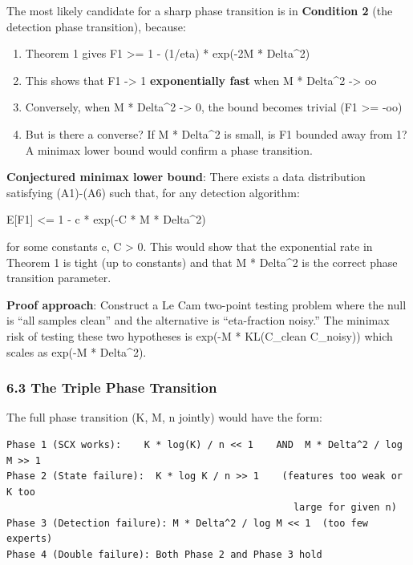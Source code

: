 \documentclass[
  12pt,
]{article}
\providecommand{\tightlist}{%
  \setlength{\itemsep}{0pt}\setlength{\parskip}{0pt}}
\begin{document}
The most likely candidate for a sharp phase transition is in
\textbf{Condition 2} (the detection phase transition), because:

\begin{enumerate}
\def\labelenumi{\arabic{enumi}.}
\tightlist
\item
  Theorem 1 gives F1 \textgreater= 1 - (1/eta) * exp(-2M * Delta\^{}2)
\item
  This shows that F1 -\textgreater{} 1 \textbf{exponentially fast} when
  M * Delta\^{}2 -\textgreater{} oo
\item
  Conversely, when M * Delta\^{}2 -\textgreater{} 0, the bound becomes
  trivial (F1 \textgreater= -oo)
\item
  But is there a converse? If M * Delta\^{}2 is small, is F1 bounded
  away from 1? A minimax lower bound would confirm a phase transition.
\end{enumerate}

\textbf{Conjectured minimax lower bound}: There exists a data
distribution satisfying (A1)-(A6) such that, for any detection
algorithm:

E{[}F1{]} \textless= 1 - c * exp(-C * M * Delta\^{}2)

for some constants c, C \textgreater{} 0. This would show that the
exponential rate in Theorem 1 is tight (up to constants) and that M *
Delta\^{}2 is the correct phase transition parameter.

\textbf{Proof approach}: Construct a Le Cam two-point testing problem
where the null is ``all samples clean'' and the alternative is
``eta-fraction noisy.'' The minimax risk of testing these two hypotheses
is exp(-M * KL(C\_clean \textbar\textbar{} C\_noisy)) which scales as
exp(-M * Delta\^{}2).

\subsubsection{6.3 The Triple Phase
Transition}\label{the-triple-phase-transition}

The full phase transition (K, M, n jointly) would have the form:

\begin{verbatim}
Phase 1 (SCX works):    K * log(K) / n << 1    AND  M * Delta^2 / log M >> 1
Phase 2 (State failure):  K * log K / n >> 1    (features too weak or K too
                                                  large for given n)
Phase 3 (Detection failure): M * Delta^2 / log M << 1  (too few experts)
Phase 4 (Double failure): Both Phase 2 and Phase 3 hold
\end{verbatim}
\end{document}
